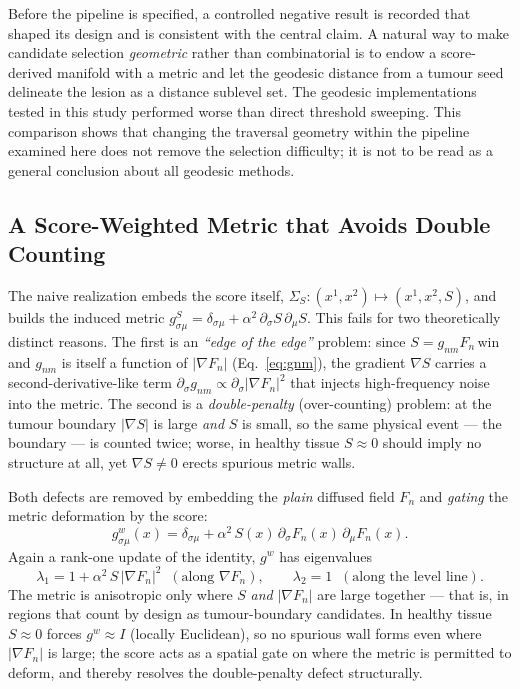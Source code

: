 \documentclass[11pt,a4paper]{article}
\begin{document}
Before the pipeline is specified, a controlled negative result is recorded that
shaped its design and is consistent with the central claim. A natural way to make
candidate selection \emph{geometric} rather than combinatorial is to endow a
score-derived manifold with a metric and let the geodesic distance from a tumour
seed delineate the lesion as a distance sublevel set. The geodesic implementations
tested in this study performed worse than direct threshold sweeping. This
comparison shows that changing the traversal geometry within the pipeline examined
here does not remove the selection difficulty; it is not to be read as a general
conclusion about all geodesic methods.

\subsection{A Score-Weighted Metric that Avoids Double Counting}\label{sec:geodesic-metric}

The naive realization embeds the score itself,
$\Sigma_S:(x^1,x^2)\mapsto(x^1,x^2,S)$, and builds the induced metric
$g^S_{\sigma\mu}=\delta_{\sigma\mu}+\alpha^2\,\partial_\sigma S\,\partial_\mu S$.
This fails for two theoretically distinct reasons. The first is an \emph{``edge of
the edge''} problem: since $S=g_{nm}F_n\,\mathrm{win}$ and $g_{nm}$ is itself a
function of $|\nabla F_n|$ (Eq.~\ref{eq:gnm}), the gradient $\nabla S$ carries a
second-derivative-like term
$\partial_\sigma g_{nm}\propto\partial_\sigma|\nabla F_n|^2$ that injects
high-frequency noise into the metric. The second is a \emph{double-penalty}
(over-counting) problem: at the tumour boundary $|\nabla S|$ is large \emph{and} $S$
is small, so the same physical event --- the boundary --- is counted twice; worse,
in healthy tissue $S\approx0$ should imply no structure at all, yet $\nabla S\neq0$
erects spurious metric walls.

Both defects are removed by embedding the \emph{plain} diffused field $F_n$ and
\emph{gating} the metric deformation by the score:
\begin{equation}
g^{w}_{\sigma\mu}(x)=\delta_{\sigma\mu}+\alpha^2\,S(x)\,\partial_\sigma F_n(x)\,\partial_\mu F_n(x).
\label{eq:score-weighted-metric}
\end{equation}
Again a rank-one update of the identity, $g^{w}$ has eigenvalues
\begin{equation}
\lambda_1=1+\alpha^2\,S\,|\nabla F_n|^2 \;\;(\text{along } \nabla F_n),\qquad \lambda_2=1\;\;(\text{along the level line}).
\label{eq:gw-eigen}
\end{equation}
The metric is anisotropic only where $S$ \emph{and} $|\nabla F_n|$ are large
together --- that is, in regions that count by design as tumour-boundary
candidates. In healthy tissue $S\approx0$ forces $g^{w}\approx I$ (locally
Euclidean), so no spurious wall forms even where $|\nabla F_n|$ is large; the score
acts as a spatial gate on where the metric is permitted to deform, and thereby
resolves the double-penalty defect structurally.
\end{document}
